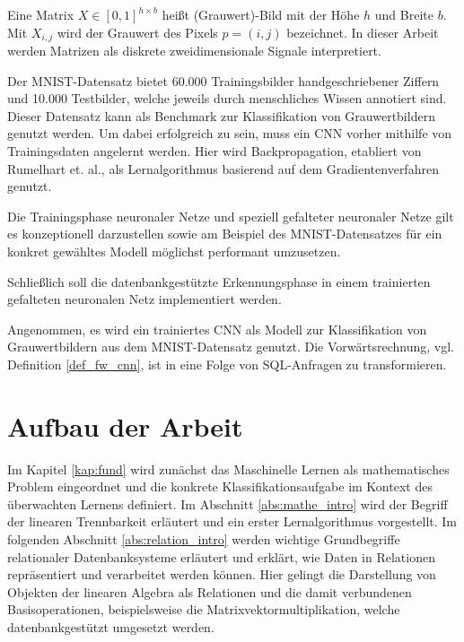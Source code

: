 \begin{defi}
    \label{def:image}
    Eine Matrix $X \in [0,1]^{h \times b}$ heißt (Grauwert)-Bild mit der Höhe $h$ und Breite $b$. Mit $X_{i,j}$ wird der Grauwert des Pixels $p=(i,j)$ bezeichnet. In dieser Arbeit werden Matrizen als diskrete zweidimensionale Signale interpretiert.
\end{defi}
Der MNIST-Datensatz bietet 60.000 Trainingsbilder handgeschriebener Ziffern und 10.000 Testbilder, welche jeweils durch menschliches
Wissen annotiert sind. Dieser Datensatz kann als Benchmark zur Klassifikation von Grauwertbildern genutzt werden. Um dabei erfolgreich zu sein, muss ein CNN vorher mithilfe von Trainingsdaten angelernt werden. Hier wird Backpropagation, etabliert von Rumelhart et. al.\cite{MLPbook}, als Lernalgorithmus basierend auf dem Gradientenverfahren 
genutzt.
\begin{problem}
    \label{prop:train}
    Die Trainingsphase neuronaler Netze und speziell gefalteter neuronaler Netze gilt es konzeptionell darzustellen sowie am Beispiel des MNIST-Datensatzes für ein konkret gewähltes Modell möglichst performant umzusetzen. 
\end{problem}

Schließlich soll die datenbankgestützte Erkennungsphase in einem trainierten gefalteten neuronalen Netz implementiert werden.

\begin{problem}
    \label{prob:ffCCN}
    Angenommen, es wird ein trainiertes CNN als Modell zur Klassifikation von Grauwertbildern aus dem MNIST-Datensatz genutzt. Die Vorwärtsrechnung, vgl. Definition \ref{def_fw_cnn}, ist in eine Folge von SQL-Anfragen zu transformieren.
\end{problem}

\section*{Aufbau der Arbeit}
\label{abs:glied}
Im Kapitel \ref{kap:fund} wird zunächst das Maschinelle Lernen als mathematisches Problem eingeordnet und die konkrete Klassifikationsaufgabe im Kontext des überwachten Lernens definiert. Im Abschnitt \ref{abs:mathe_intro} wird der Begriff der linearen Trennbarkeit erläutert und ein erster Lernalgorithmus vorgestellt. Im folgenden Abschnitt \ref{abs:relation_intro} werden wichtige Grundbegriffe relationaler Datenbanksysteme erläutert und erklärt, wie Daten in Relationen repräsentiert und verarbeitet werden können. Hier gelingt die Darstellung von Objekten der linearen Algebra als Relationen und die damit verbundenen Basisoperationen, beispielsweise die Matrixvektormultiplikation, welche datenbankgestützt umgesetzt werden.

